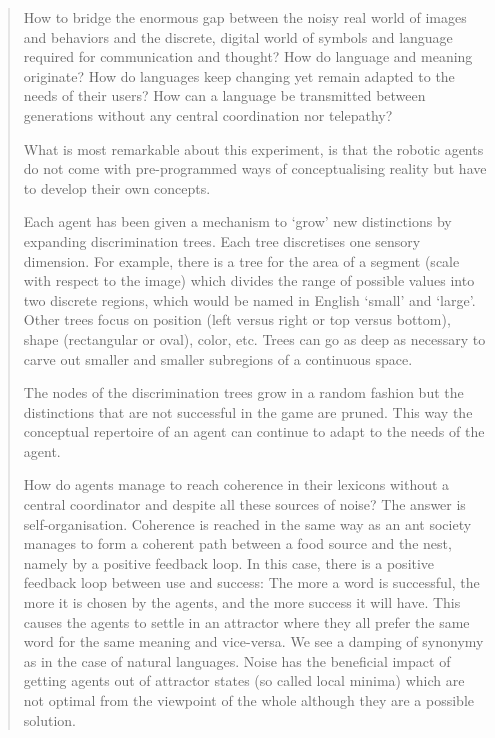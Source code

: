 \begin{quotation}
How to bridge the enormous gap between the noisy real world of images and behaviors and the discrete, digital world of symbols and language required for communication and thought? How do language and meaning originate? How do languages keep changing yet remain adapted to the needs of their users? How can a language be transmitted between generations without any central coordination nor telepathy?

What is most remarkable about this experiment, is that the robotic agents do not come with pre-programmed ways of conceptualising reality but have to develop their own concepts.

Each agent has been given a mechanism to `grow' new distinctions by expanding discrimination trees. Each tree discretises one sensory dimension. For example, there is a tree for the area of a segment (scale with respect to the image) which divides the range of possible values into two discrete regions, which would be named in English `small' and `large'. Other trees focus on position (left versus right or top versus bottom), shape (rectangular or oval), color, etc. Trees can go as deep as necessary to carve out smaller and smaller subregions of a continuous space.

The nodes of the discrimination trees grow in a random fashion but the distinctions that are not successful in the game are pruned. This way the conceptual repertoire of an agent can continue to adapt to the needs of the agent.

How do agents manage to reach coherence in their lexicons without a central coordinator and despite all these sources of noise? The answer is self-organisation. Coherence is reached in the same way as an ant society manages to form a coherent path between a food source and the nest, namely by a positive feedback loop. In this case, there is a positive feedback loop between use and success: The more a word is successful, the more it is chosen by the agents, and the more success it will have. This causes the agents to settle in an attractor where they all prefer the same word for the same meaning and vice-versa. We see a damping of synonymy as in the case of natural languages. Noise has the beneficial impact of getting agents out of attractor states (so called local minima) which are not optimal from the viewpoint of the whole although they are a possible solution.


\end{quotation}
